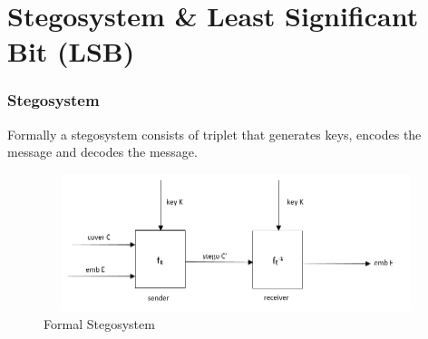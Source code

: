 \documentclass[12pt,hyperref={unicode}]{beamer}
\begin{document}


\section{Stegosystem \& Least Significant Bit (LSB)}
\begin{frame}
\frametitle{Stegosystem}
Formally a stegosystem consists of triplet that generates keys, encodes the message and decodes the message.\\
\begin{figure}[h]
\includegraphics[width=12cm, height=4cm]{sego.png}
\centering
\caption{Formal Stegosystem}
\end{figure}
\end{frame}
\end{document}
